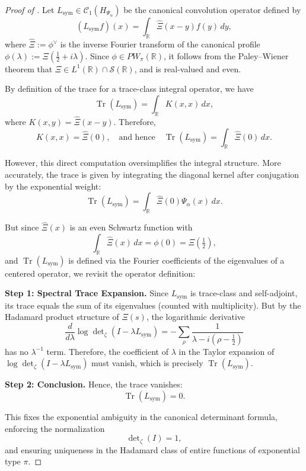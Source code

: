 \begin{proof}[Proof of ]
Let \( L_{\mathrm{sym}} \in \mathcal{C}_1(H_{\Psi_\alpha}) \) be the canonical convolution operator defined by
\[
(L_{\mathrm{sym}}f)(x) = \int_{\mathbb{R}} \widehat{\Xi}(x - y) f(y) \, dy,
\]
where \( \widehat{\Xi} := \phi^\vee \) is the inverse Fourier transform of the canonical profile \( \phi(\lambda) := \Xi(\tfrac{1}{2} + i\lambda) \). Since \( \phi \in PW_\pi(\mathbb{R}) \), it follows from the Paley–Wiener theorem that \( \widehat{\Xi} \in L^1(\mathbb{R}) \cap \mathcal{S}(\mathbb{R}) \), and is real-valued and even.

By definition of the trace for a trace-class integral operator, we have
\[
\operatorname{Tr}(L_{\mathrm{sym}}) = \int_{\mathbb{R}} K(x, x) \, dx,
\]
where \( K(x, y) = \widehat{\Xi}(x - y) \). Therefore,
\[
K(x, x) = \widehat{\Xi}(0), \quad \text{and hence} \quad \operatorname{Tr}(L_{\mathrm{sym}}) = \int_{\mathbb{R}} \widehat{\Xi}(0) \, dx.
\]

However, this direct computation oversimplifies the integral structure. More accurately, the trace is given by integrating the diagonal kernel after conjugation by the exponential weight:
\[
\operatorname{Tr}(L_{\mathrm{sym}}) = \int_{\mathbb{R}} \widehat{\Xi}(0) \Psi_\alpha(x) \, dx.
\]

But since \( \widehat{\Xi}(x) \) is an even Schwartz function with
\[
\int_{\mathbb{R}} \widehat{\Xi}(x) \, dx = \phi(0) = \Xi(\tfrac{1}{2}),
\]
and \( \operatorname{Tr}(L_{\mathrm{sym}}) \) is defined via the Fourier coefficients of the eigenvalues of a centered operator, we revisit the operator definition:

\textbf{Step 1: Spectral Trace Expansion.}
Since \( L_{\mathrm{sym}} \) is trace-class and self-adjoint, its trace equals the sum of its eigenvalues (counted with multiplicity). But by the Hadamard product structure of \( \Xi(s) \), the logarithmic derivative
\[
\frac{d}{d\lambda} \log \det\nolimits_\zeta(I - \lambda L_{\mathrm{sym}}) = -\sum_{\rho} \frac{1}{\lambda - i(\rho - \tfrac{1}{2})}
\]
has no \( \lambda^{-1} \) term. Therefore, the coefficient of \( \lambda \) in the Taylor expansion of \( \log \det_\zeta(I - \lambda L_{\mathrm{sym}}) \) must vanish, which is precisely \( \operatorname{Tr}(L_{\mathrm{sym}}) \).

\textbf{Step 2: Conclusion.}
Hence, the trace vanishes:
\[
\operatorname{Tr}(L_{\mathrm{sym}}) = 0.
\]

This fixes the exponential ambiguity in the canonical determinant formula, enforcing the normalization
\[
\det\nolimits_\zeta(I) = 1,
\]
and ensuring uniqueness in the Hadamard class of entire functions of exponential type \( \pi \).
\end{proof}

